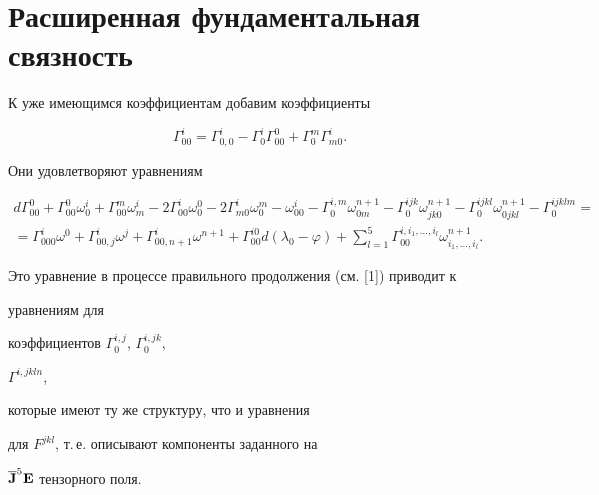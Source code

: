  


\section{Расширенная фундаментальная связность} 


 


К уже имеющимся коэффициентам добавим коэффициенты


\begin{equation} 


\Gamma^i_{00}=\Gamma^i_{0,0}- 


\Gamma^i_0\Gamma^0_{00}+ 


\Gamma^m_0\Gamma^i_{m0}. 


\end{equation} 


Они удовлетворяют уравнениям


\begin{multline*} 


d\Gamma^0_{00}+\Gamma^0_{00}\omega^i_0+\Gamma^m_{00}\omega^i_m- 


2\Gamma^i_{00}\omega^0_0-2\Gamma^i_{m0}\omega^m_0- 


\omega^i_{00}-\Gamma^{i,m}_0\omega^{n+1}_{0m}- 


\Gamma^{ijk}_0\omega^{n+1}_{jk0}- 


\Gamma^{ijkl}_0\omega^{n+1}_{0jkl}-\Gamma^{ijklm}_0= \\ 


=\Gamma^i_{000}\omega^0+\Gamma^i_{00,j}\omega^j+ 


\Gamma^i_{00,n+1}\omega^{n+1}+ 


\Gamma^{i0}_{00}d(\lambda_0-\varphi)+ 


\sum^5_{l=1}\Gamma^{i,i_1,\dotsc,i_l}_{00} 


\omega^{n+1}_{i_1,\dotsc,i_l}. 


\end{multline*} 


Это уравнение в процессе правильного продолжения (см. [1]) приводит к  


уравнениям для 


коэффициентов $\Gamma^{i,j}_0$, $\Gamma^{i,jk}_0$, 


$\Gamma^{i,jkln}$, 


которые имеют ту же структуру, что и уравнения 


для $F^{jkl}$, т.\,е. описывают компоненты заданного на 


$\overline{\bold J}^5\bold E$ тензорного поля. 


